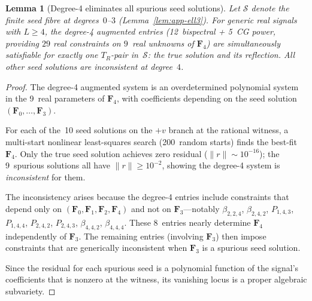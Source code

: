 \documentclass{article}
\newtheorem{lemma}[theorem]{Lemma}
\theoremstyle{definition}
\theoremstyle{remark}
\newcommand{\norm}[1]{\lVert #1 \rVert}
\theoremstyle{definition}
\begin{document}
\begin{lemma}[Degree-4 eliminates all spurious seed solutions]
\label{lem:app-degree4-filter}
Let $\mathcal{S}$ denote the finite seed fibre at degrees~$0$--$3$
(Lemma~\ref{lem:app-ell3}).
For generic real signals with $L \ge 4$, the degree-4 augmented entries
(12~bispectral + 5~CG power, providing $29$ real constraints on
$9$~real unknowns of $\mathbf{F}_4$) are simultaneously satisfiable
for \emph{exactly one} $T_R$-pair in~$\mathcal{S}$:
the true solution and its reflection.
All other seed solutions are inconsistent at degree~$4$.
\end{lemma}
\begin{proof}
The degree-4 augmented system is an overdetermined polynomial system
in the 9~real parameters of $\mathbf{F}_4$, with coefficients depending
on the seed solution $(\mathbf{F}_0, \ldots, \mathbf{F}_3)$.

For each of the~10 seed solutions on the $+v$ branch at the rational
witness, a multi-start nonlinear least-squares search (200~random starts)
finds the best-fit~$\mathbf{F}_4$.
Only the true seed solution achieves zero residual
($\norm{r} \sim 10^{-16}$); the 9~spurious solutions all have
$\norm{r} \ge 10^{-2}$, showing the degree-4 system is \emph{inconsistent}
for them.

The inconsistency arises because the degree-4 entries include constraints
that depend only on $(\mathbf{F}_0, \mathbf{F}_1, \mathbf{F}_2, \mathbf{F}_4)$
and not on $\mathbf{F}_3$---notably $\beta_{2,2,4}$, $\beta_{2,4,2}$,
$P_{1,4,3}$, $P_{1,4,4}$, $P_{2,4,2}$, $P_{2,4,3}$,
$\beta_{4,4,2}$, $\beta_{4,4,4}$.
These 8~entries nearly determine $\mathbf{F}_4$ independently of $\mathbf{F}_3$.
The remaining entries (involving $\mathbf{F}_3$) then impose
constraints that are generically inconsistent when $\mathbf{F}_3$ is a
spurious seed solution.

Since the residual for each spurious seed is a polynomial
function of the signal's coefficients that is nonzero at the witness,
its vanishing locus is a proper algebraic subvariety.
\end{proof}
\end{document}
